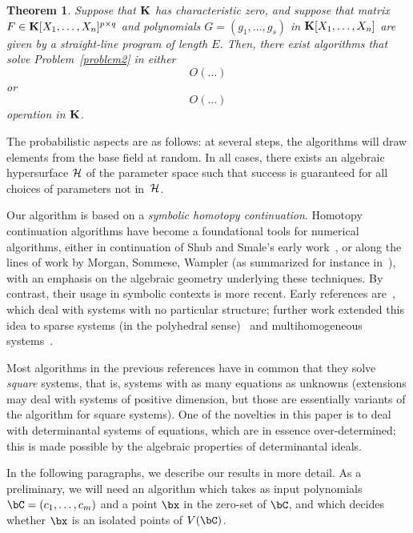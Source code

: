 \documentclass[12pt]{article}
\newtheorem{theorem}[definition]{Theorem}
\begin{document}
\begin{theorem}
  Suppose that $\mathbf{K}$ has characteristic zero, and suppose that matrix
  ${F} \in \mathbf{K}[X_1,\dots,X_n]^{p \times q}$ and polynomials
  $G=(g_1,\dots,g_s)$ in $\mathbf{K}[X_1,\dots,X_n]$ are given by a
  straight-line program of length $E$. Then, there exist 
   algorithms that solve Problem~\ref{problem2} in either
   $$O( \dots )$$
or 
   $$O( \dots )$$
  operation in $\mathbf{K}$.
\end{theorem}
The probabilistic aspects are as follows: at several steps, the
algorithms will draw elements from the base field at random. In all
cases, there exists an algebraic hypersurface $\cal H$ of the parameter
space such that success is guaranteed for all choices of parameters not
in~$\cal H$.


Our algorithm is based on a {\em symbolic homotopy continuation}.
Homotopy continuation algorithms have become a foundational tools for
numerical algorithms, either in continuation of Shub and Smale's early
work~\cite{ShSm93}, or along the lines of work by Morgan, Sommese,
Wampler (as summarized for instance in~\cite{SoWa05}), with an emphasis
on the algebraic geometry underlying these techniques. By contrast,
their usage in symbolic contexts is more recent. Early references
are~\cite{HeKrPuSaWa99,BoMaWaWa04}, which deal with systems with no
particular structure; further work extended this idea to sparse
systems (in the polyhedral sense)~\cite{JeMaSoWa09,HeJeSa10,HeJeSa13,HeJeSa14}
and multihomogeneous systems~\cite{HeJeSaSo02,SaSc16}.

Most algorithms in the previous references have in common that they
solve {\em square} systems, that is, systems with as many equations as
unknowns (extensions may deal with systems of positive dimension, but
those are essentially variants of the algorithm for square systems).
One of the novelties in this paper is to deal with determinantal
systems of equations, which are in essence over-determined; this is
made possible by the algebraic properties of determinantal ideals.

In the following paragraphs, we describe our results in more detail.
As a preliminary, we will need an algorithm which takes as input
polynomials $\bC=(c_1,\dots,c_m)$ and a point $\bx$ in the zero-set of
$\bC$, and which decides whether $\bx$ is an isolated points
of $V(\bC)$.
\end{document}
